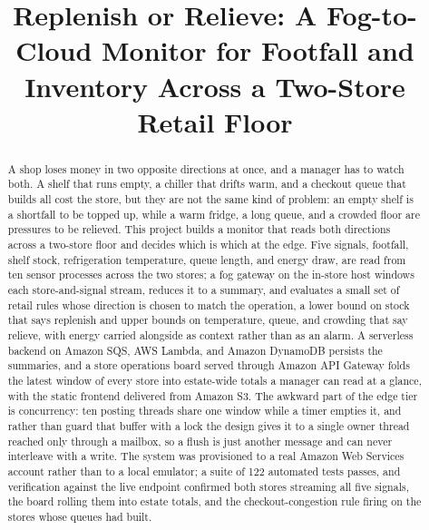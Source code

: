 \documentclass[conference]{IEEEtran}
\begin{document}
\title{Replenish or Relieve: A Fog-to-Cloud Monitor for Footfall and Inventory Across a Two-Store Retail Floor}

\author{
}

\maketitle

\begin{abstract}
A shop loses money in two opposite directions at once, and a manager has to watch both. A shelf that runs empty, a chiller that drifts warm, and a checkout queue that builds all cost the store, but they are not the same kind of problem: an empty shelf is a shortfall to be topped up, while a warm fridge, a long queue, and a crowded floor are pressures to be relieved. This project builds a monitor that reads both directions across a two-store floor and decides which is which at the edge. Five signals, footfall, shelf stock, refrigeration temperature, queue length, and energy draw, are read from ten sensor processes across the two stores; a fog gateway on the in-store host windows each store-and-signal stream, reduces it to a summary, and evaluates a small set of retail rules whose direction is chosen to match the operation, a lower bound on stock that says replenish and upper bounds on temperature, queue, and crowding that say relieve, with energy carried alongside as context rather than as an alarm. A serverless backend on Amazon SQS, AWS Lambda, and Amazon DynamoDB persists the summaries, and a store operations board served through Amazon API Gateway folds the latest window of every store into estate-wide totals a manager can read at a glance, with the static frontend delivered from Amazon S3. The awkward part of the edge tier is concurrency: ten posting threads share one window while a timer empties it, and rather than guard that buffer with a lock the design gives it to a single owner thread reached only through a mailbox, so a flush is just another message and can never interleave with a write. The system was provisioned to a real Amazon Web Services account rather than to a local emulator; a suite of 122 automated tests passes, and verification against the live endpoint confirmed both stores streaming all five signals, the board rolling them into estate totals, and the checkout-congestion rule firing on the stores whose queues had built.
\end{abstract}
\end{document}

